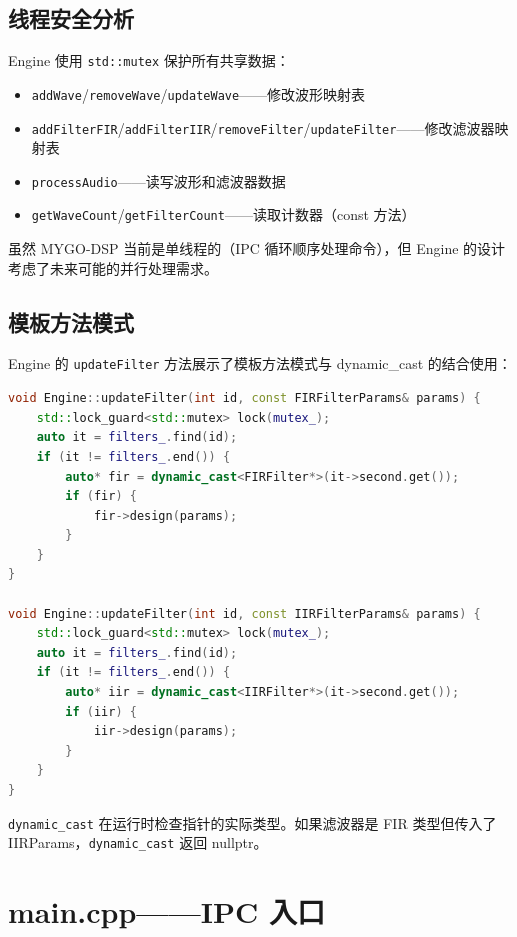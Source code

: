 ﻿\documentclass[12pt,a4paper,oneside]{ctexbook}
\begin{document}
\subsection{线程安全分析}

Engine 使用 \texttt{std::mutex} 保护所有共享数据：
\begin{itemize}
    \item \texttt{addWave}/\texttt{removeWave}/\texttt{updateWave}——修改波形映射表
    \item \texttt{addFilterFIR}/\texttt{addFilterIIR}/\texttt{removeFilter}/\texttt{updateFilter}——修改滤波器映射表
    \item \texttt{processAudio}——读写波形和滤波器数据
    \item \texttt{getWaveCount}/\texttt{getFilterCount}——读取计数器（const 方法）
\end{itemize}

虽然 MYGO-DSP 当前是单线程的（IPC 循环顺序处理命令），但 Engine 的设计考虑了未来可能的并行处理需求。

\subsection{模板方法模式}

Engine 的 \texttt{updateFilter} 方法展示了模板方法模式与 dynamic\_cast 的结合使用：

\begin{lstlisting}[language=C++, caption={通过 dynamic\_cast 区分滤波器类型}]
void Engine::updateFilter(int id, const FIRFilterParams& params) {
    std::lock_guard<std::mutex> lock(mutex_);
    auto it = filters_.find(id);
    if (it != filters_.end()) {
        auto* fir = dynamic_cast<FIRFilter*>(it->second.get());
        if (fir) {
            fir->design(params);
        }
    }
}

void Engine::updateFilter(int id, const IIRFilterParams& params) {
    std::lock_guard<std::mutex> lock(mutex_);
    auto it = filters_.find(id);
    if (it != filters_.end()) {
        auto* iir = dynamic_cast<IIRFilter*>(it->second.get());
        if (iir) {
            iir->design(params);
        }
    }
}
\end{lstlisting}

\texttt{dynamic\_cast} 在运行时检查指针的实际类型。如果滤波器是 FIR 类型但传入了 IIRParams，\texttt{dynamic\_cast} 返回 nullptr。

\section{main.cpp——IPC 入口}
\end{document}
